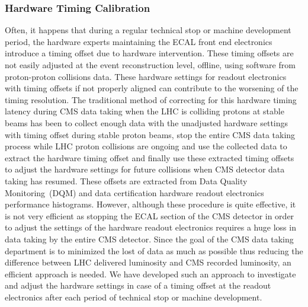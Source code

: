 \begin{center}
{}
\label{fig:TimeCalib}
\end{center}

\subsubsection{Hardware Timing Calibration}
Often, it happens that during a regular technical stop or machine development period, the hardware experts maintaining the ECAL front end electronics introduce a timing offset due to hardware intervention. These timing offsets are not easily adjusted at the event reconstruction level, offline, using software from proton-proton collisions data. These hardware settings for readout electronics with timing offsets if not properly aligned can contribute to the worsening of the timing resolution. The traditional method of correcting for this hardware timing latency during CMS data taking when the LHC is colliding protons at stable beams has been to collect enough data with the unadjusted hardware settings with timing offset during stable proton beams, stop the entire CMS data taking process while LHC proton collisions are ongoing and use the collected data to extract the hardware timing offset and finally use these extracted timing offsets to adjust the hardware settings for future collisions when CMS detector data taking has resumed. These offsets are extracted from Data Quality Monitoring~(DQM) and data certification hardware readout electronics performance histograms. However, although these procedure is quite effective, it is not very efficient as stopping the ECAL section of the CMS detector in order to adjust the settings of the hardware readout electronics requires a huge loss in data taking by the entire CMS detector. Since the goal of the CMS data taking department is to minimized the lost of data as much as possible thus reducing the difference between LHC delivered luminosity and CMS recorded luminosity, an efficient approach is needed. We have developed such an approach to investigate and adjust the hardware settings in case of a timing offset at the readout electronics after each period of technical stop or machine development.
